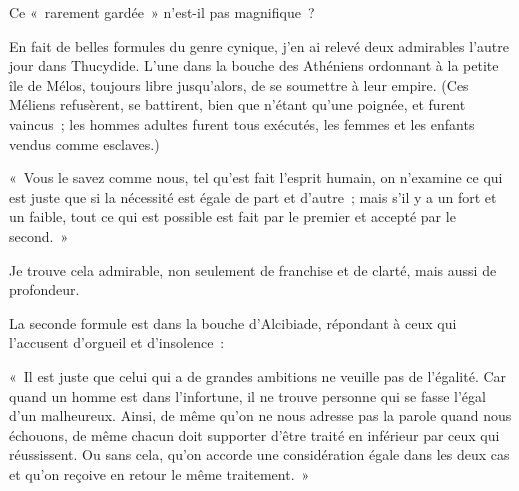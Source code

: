 \documentclass[french,twoside]{book} %
\begin{document}
\noindent Ce « rarement gardée » n'est-il pas magnifique ?\par
En fait de belles formules du genre cynique, j'en ai relevé deux admirables l'autre jour dans Thucydide. L'une dans la bouche des Athéniens ordonnant à la petite île de Mélos, toujours libre jusqu'alors, de se soumettre à leur empire. (Ces Méliens refusèrent, se battirent, bien que n'étant qu'une poignée, et furent vaincus ; les hommes adultes furent tous exécutés, les femmes et les enfants vendus comme esclaves.)\par
« Vous le savez comme nous, tel qu'est fait l'esprit humain, on n'examine ce qui est juste que si la nécessité est égale de part et d'autre ; mais s'il y a un fort et un faible, tout ce qui est possible est fait par le premier et accepté par le second. »\par
Je trouve cela admirable, non seulement de franchise et de clarté, mais aussi de profondeur.\par
La seconde formule est dans la bouche d'Alcibiade, répondant à ceux qui l'accusent d'orgueil et d'insolence :\par
« Il est juste que celui qui a de grandes ambitions ne veuille pas de l'égalité. Car quand un homme est dans l'infortune, il ne trouve personne qui se fasse l'égal d'un malheureux. Ainsi, de même qu'on ne nous adresse pas la parole quand nous échouons, de même chacun doit supporter d'être traité en inférieur par ceux qui réussissent. Ou sans cela, qu'on accorde une considé­ration égale dans les deux cas et qu'on reçoive en retour le même traitement. »\par
\end{document}
